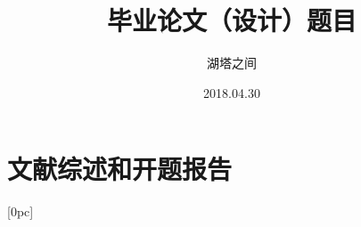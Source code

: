 \documentclass[fangfont=STFANGSO.TTF,heifont=simhei.ttf,numbib]{zju-thesis}
\title{毕业论文（设计）题目}{浙江大学本科生毕业论文（设计）}
\author{湖塔之间}{3140100000}
\date{2018.04.30}
\begin{document}
	\makecover
	
	
	

	

    \tableofcontents
	\begin{refsection}
	
	\end{refsection}
	
	

	
	
	\part{文献综述和开题报告}
	\renewcommand\thechapter{\zhnum{chapter}、}
	[0pc]{\addvspace{0pt}\hspace*{0pc}}{\thecontentslabel}{}{
	\thecontentspage} 
	
\end{document}
